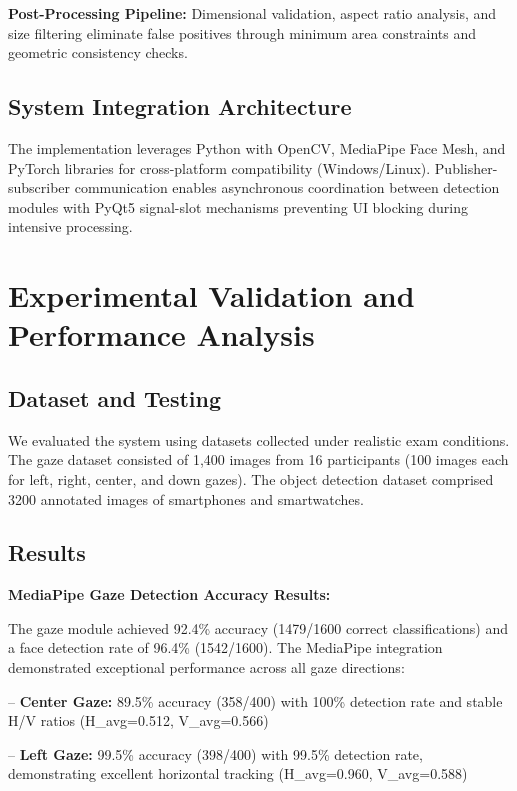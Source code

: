 \documentclass[conference]{IEEEtran}
\begin{document}
\textbf{Post-Processing Pipeline:} Dimensional validation, aspect ratio analysis, and 
size filtering eliminate false positives through minimum area constraints and geometric 
consistency checks.

\subsection{System Integration Architecture}

The implementation leverages Python with OpenCV, MediaPipe Face Mesh, and PyTorch 
libraries for cross-platform compatibility (Windows/Linux). Publisher-subscriber 
communication enables asynchronous coordination between detection modules with PyQt5 
signal-slot mechanisms preventing UI blocking during intensive processing.

\section{Experimental Validation and Performance Analysis}

\subsection{Dataset and Testing}
We evaluated the system using datasets collected under realistic exam conditions. 
The gaze dataset consisted of 1,400 images from 16 participants (100 images each 
for left, right, center, and down gazes). The object detection dataset comprised 
3200 annotated images of smartphones and smartwatches.

\subsection{Results}
\textbf{MediaPipe Gaze Detection Accuracy Results:}

The gaze module achieved 92.4\% accuracy (1479/1600 correct classifications) 
and a face detection rate of 96.4\% (1542/1600). The MediaPipe integration demonstrated 
exceptional performance across all gaze directions\cite{jakhete2024comprehensive,frontiersgaze2024,akinyelu2021cnn}:

-- \textbf{Center Gaze:} 89.5\% accuracy (358/400) with 100\% detection rate and stable H/V ratios (H\_avg=0.512, V\_avg=0.566)

-- \textbf{Left Gaze:} 99.5\% accuracy (398/400) with 99.5\% detection rate, demonstrating excellent horizontal tracking (H\_avg=0.960, V\_avg=0.588)
\end{document}
